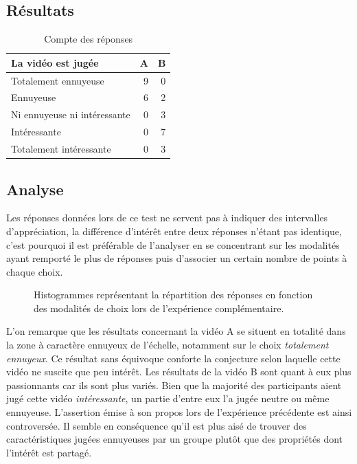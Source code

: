 \documentclass[12pt,fleqn,oneside,french,openany]{book} %
\begin{document}
\subsection{Résultats} \label{ssec:resultats1.2}
\begin{table}[h]
	\centering
	\caption{Compte des réponses} \label{tbl:résultats1.2}
	\begin{tabular}{lrr}
		\toprule
		\textbf{La vidéo est jugée} & \textbf{A} & \textbf{B} \\ \midrule
		Totalement ennuyeuse & 9 & 0 \\ 
		Ennuyeuse & 6 & 2 \\
		Ni ennuyeuse ni intéressante & 0 & 3 \\
		Intéressante & 0 & 7 \\ 
		Totalement intéressante & 0 & 3 \\ \bottomrule
	\end{tabular}
\end{table}

\subsection{Analyse} \label{ssec:analyse1.2}

\begin{remark}
Les réponses données lors de ce test ne servent pas à indiquer des intervalles d'appréciation, la différence d'intérêt entre deux réponses n'étant pas identique, c'est pourquoi il est préférable de l'analyser en se concentrant sur les modalités ayant remporté le plus de réponses puis d'associer un certain nombre de points à chaque choix.
\end{remark}

\begin{figure}[h!]
\centering
\begin{minipage}[t]{.49\textwidth}
\end{minipage}
\hfill
\begin{minipage}[t]{.49\textwidth}
\end{minipage}
\caption{Histogrammes représentant la répartition des réponses en fonction des modalités de choix lors de l'expérience complémentaire.}
\end{figure}

L'on remarque que les résultats concernant la vidéo A se situent en totalité dans la zone à caractère ennuyeux de l'échelle, notamment sur le choix \emph{totalement ennuyeux}. Ce résultat sans équivoque conforte la conjecture selon laquelle cette vidéo ne suscite que peu intérêt. Les résultats de la vidéo B sont quant à eux plus passionnants car ils sont plus variés. Bien que la majorité des participants aient jugé cette vidéo \emph{intéressante}, un partie d'entre eux l'a jugée neutre ou même ennuyeuse. L'assertion émise à son propos lors de l'expérience précédente est ainsi controversée. Il semble en conséquence qu'il est plus aisé de trouver des caractéristiques jugées ennuyeuses par un groupe plutôt que des propriétés dont l'intérêt est partagé.
\end{document}
